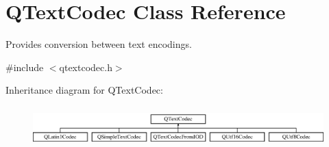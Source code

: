 \hypertarget{class_q_text_codec}{}\section{Q\+Text\+Codec Class Reference}
\label{class_q_text_codec}


Provides conversion between text encodings.  




{\ttfamily \#include $<$qtextcodec.\+h$>$}

Inheritance diagram for Q\+Text\+Codec\+:\begin{figure}[H]
\begin{center}
\leavevmode
\includegraphics[height=1.588652cm]{class_q_text_codec}
\end{center}
\end{figure}
